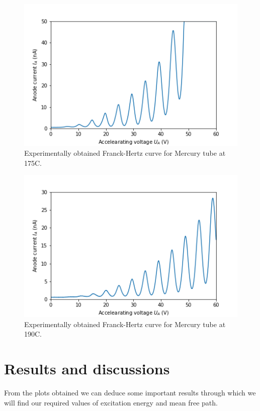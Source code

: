 \documentclass[%
 reprint,
 amsmath,amssymb,
 aps,
]{revtex4-2}
\begin{document}
    \begin{figure}[htp]
        \centering
        \includegraphics[scale = 0.5]{Figures/175HgPlot.png}
        \caption{Experimentally obtained Franck-Hertz curve for Mercury tube at 175\degree C.}
        \label{fig:175Hg}
    \end{figure}
    \begin{figure}[htp]
        \centering
        \includegraphics[scale = 0.5]{Figures/190HgPlot.png}
        \caption{Experimentally obtained Franck-Hertz curve for Mercury tube at 190\degree C.}
        \label{fig:190Hg}
    \end{figure}

\section{Results and discussions}
    From the plots obtained we can deduce some important results through which we will find our required values of excitation energy and mean free path.
\end{document}
